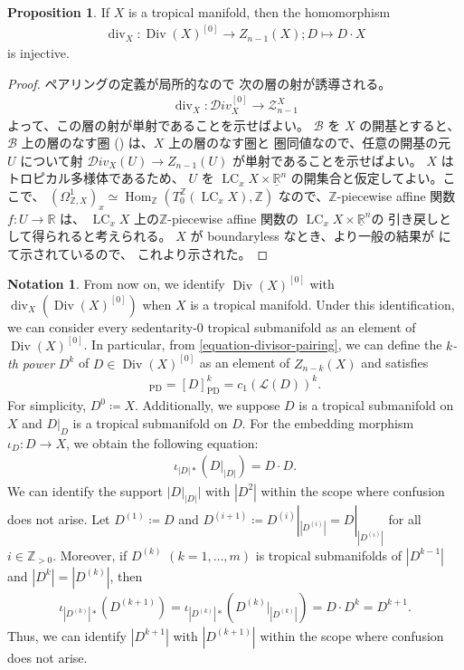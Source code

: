 \documentclass[a4paper,dvipdfmx,reqno,12pt]{amsart}
\theoremstyle{definition}
\newtheorem{proposition}[theorem]{Proposition}
\newtheorem{notation}[theorem]{Notation}
\newcommand{\deq}{\coloneqq}
\newcommand{\opn}[1]{\operatorname{#1}}
\newcommand{\PD}[1]{[#1]_{\mathrm{PD}}}
\numberwithin{equation}{section}
\begin{document}
\begin{proposition}
If $X$ is a tropical manifold, then the homomorphism
\begin{align}
\opn{div}_X\colon
\opn{Div}(X)^{[0]}\to Z_{n-1}(X); D\mapsto D\cdot X    
\end{align}
is injective.
\end{proposition}
\begin{proof}
ペアリングの定義が局所的なので
次の層の射が誘導される。
\begin{align}
\opn{div}_X\colon \mathcal{D}iv_X^{[0]}\to 
\mathscr{Z}_{n-1}^{X}
\end{align}
よって、この層の射が単射であることを示せばよい。
$\mathcal{B}$ を $X$ の開基とすると、
$\mathcal{B}$ 上の層のなす圏
(\cite[p.49-50]{MR2675155})
は、$X$ 上の層のなす圏と
圏同値なので、任意の開基の元 $U$ について射
$\mathcal{D}iv_X(U)\to Z_{n-1}(U)$
が単射であることを示せばよい。
$X$ はトロピカル多様体であるため、
$U$ を 
$\opn{LC}_x X\times \underline{\mathbb{R}}^{n}$
の開集合と仮定してよい。ここで、
$(\Omega_{\mathbb{Z},X}^{1})_{x}
\simeq \opn{Hom}_{\mathbb{Z}}
(T^{\mathbb{Z}}_0 (\opn{LC}_x X),\mathbb{Z})$
なので、$\mathbb{Z}$-piecewise affine 関数
$f\colon U\to \mathbb{R}$ は、
$\opn{LC}_x X$ 上の$\mathbb{Z}$-piecewise affine 関数の
$\opn{LC}_x X\times \underline{\mathbb{R}}^{n}$の
引き戻しとして得られると考えられる。
$X$ が boundaryless なとき、より一般の結果が
\cite[Theorem 4.5]{MR4246795} にて示されているので、
これより示された。
\end{proof}

\begin{notation}
\label{notation-power-divisor}
From now on, we identify
$\opn{Div}(X)^{[0]}$ with 
$\opn{div}_X(\opn{Div}(X)^{[0]})$
when $X$ is a tropical manifold.
Under this identification,
we can consider every sedentarity-0 tropical
submanifold as an element of $\opn{Div}(X)^{[0]}$.
In particular, from \cref{equation-divisor-pairing},
we can define the \emph{$k$-th power}
$D^{k}$ of $D\in \opn{Div}(X)^{[0]}$ as an element
of $Z_{n-k}(X)$ and satisfies
\begin{align}
\PD{D^{k}}=\PD{D}^{k}=c_1(\mathcal{L}(D))^{k}.
\end{align}
For simplicity, $D^{0}\deq X$.
Additionally, we suppose $D$ is a tropical submanifold on $X$
and $D|_{D}$ is a tropical submanifold on $D$.
For the embedding morphism $\iota_{D}\colon D\to X$,
we obtain the following equation:
\begin{align}
\iota_{|D|*}(D|_{|D|})=D\cdot D.
\end{align}
We can identify the support $|D|_{|D|}|$ with $|D^2|$ 
within the scope where confusion does not arise.
Let $D^{(1)}\deq D$ and $D^{(i+1)}\deq 
D^{(i)}|_{|D^{(i)}|}=D|_{|D^{(i)}|}$ for all
$i\in \mathbb{Z}_{>0}$. 
Moreover, if $D^{(k)}$ $(k=1,\ldots,m)$ is
tropical submanifolds of $|D^{k-1}|$
and $|D^{k}|=|D^{(k)}|$, then
\begin{align}
\iota_{|D^{(k)}|*}(D^{(k+1)})=
\iota_{|D^{(k)}|*}(D^{(k)}|_{|D^{(k)}|})
=D\cdot D^{k}=D^{k+1}.
\end{align}
Thus, we can identify 
$|D^{k+1}|$ with $|D^{(k+1)}|$
within the scope where confusion does not arise.
\end{notation}
\end{document}
